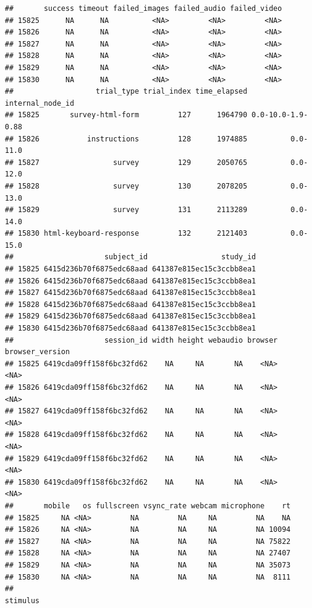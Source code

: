 \documentclass[
]{article}
\begin{document}
\begin{verbatim}
##       success timeout failed_images failed_audio failed_video
## 15825      NA      NA          <NA>         <NA>         <NA>
## 15826      NA      NA          <NA>         <NA>         <NA>
## 15827      NA      NA          <NA>         <NA>         <NA>
## 15828      NA      NA          <NA>         <NA>         <NA>
## 15829      NA      NA          <NA>         <NA>         <NA>
## 15830      NA      NA          <NA>         <NA>         <NA>
##                   trial_type trial_index time_elapsed  internal_node_id
## 15825       survey-html-form         127      1964790 0.0-10.0-1.9-0.88
## 15826           instructions         128      1974885          0.0-11.0
## 15827                 survey         129      2050765          0.0-12.0
## 15828                 survey         130      2078205          0.0-13.0
## 15829                 survey         131      2113289          0.0-14.0
## 15830 html-keyboard-response         132      2121403          0.0-15.0
##                     subject_id                 study_id
## 15825 6415d236b70f6875edc68aad 641387e815ec15c3ccbb8ea1
## 15826 6415d236b70f6875edc68aad 641387e815ec15c3ccbb8ea1
## 15827 6415d236b70f6875edc68aad 641387e815ec15c3ccbb8ea1
## 15828 6415d236b70f6875edc68aad 641387e815ec15c3ccbb8ea1
## 15829 6415d236b70f6875edc68aad 641387e815ec15c3ccbb8ea1
## 15830 6415d236b70f6875edc68aad 641387e815ec15c3ccbb8ea1
##                     session_id width height webaudio browser browser_version
## 15825 6419cda09ff158f6bc32fd62    NA     NA       NA    <NA>            <NA>
## 15826 6419cda09ff158f6bc32fd62    NA     NA       NA    <NA>            <NA>
## 15827 6419cda09ff158f6bc32fd62    NA     NA       NA    <NA>            <NA>
## 15828 6419cda09ff158f6bc32fd62    NA     NA       NA    <NA>            <NA>
## 15829 6419cda09ff158f6bc32fd62    NA     NA       NA    <NA>            <NA>
## 15830 6419cda09ff158f6bc32fd62    NA     NA       NA    <NA>            <NA>
##       mobile   os fullscreen vsync_rate webcam microphone    rt
## 15825     NA <NA>         NA         NA     NA         NA    NA
## 15826     NA <NA>         NA         NA     NA         NA 10094
## 15827     NA <NA>         NA         NA     NA         NA 75822
## 15828     NA <NA>         NA         NA     NA         NA 27407
## 15829     NA <NA>         NA         NA     NA         NA 35073
## 15830     NA <NA>         NA         NA     NA         NA  8111
##                                                                                                                                                                                                                                                                                                            stimulus

\end{verbatim}
\end{document}
